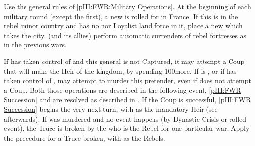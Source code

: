 \begin{digressions}



  \phmil
  \aparag Use the general rules of \ref{pIII:FWR:Military Operations}.
  \aparag At the beginning of each military round (except the first), a new
  \REVOLT is rolled for in France. If this \REVOLT is in the rebel minor
  country and has no \REVOLT nor Loyalist land force in it, place a new
  \REVOLT \facemoins which takes the city.
  \aparag \FRA (and its allies) %
  perform automatic surrenders of rebel fortresses as in the previous wars.



  \phpaix
  \aparag If \LIG has taken control of  and this
  general is not Captured, it may attempt a Coup that will make  the Heir of the kingdom, by spending 100\ducats more.
  \aparag If \FRA is \CATHCO, or if \LIG has taken control of , \FRA may attempt to murder this pretender, even if \LIG does not
  attempt a Coup.
  \aparag Both those operations are described in the following event,
  \ref{pIII:FWR Succession} and are resolved as described in
  .
  \bparag If the Coup is successful, \ref{pIII:FWR Succession} begins the very
  next turn, with  as the mandatory Heir (see
  afterwards).
  \bparag If  was murdered and no event
   happens (by Dynastic Crisis or rolled event), the Truce
  is broken by the \lig who is the Rebel for one particular war. Apply the
  procedure for a Truce broken, with \lig as the Rebels.
\end{digressions}



